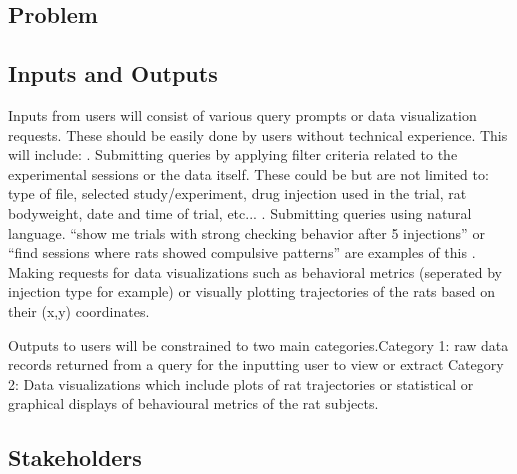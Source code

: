 \documentclass{article}
\begin{document}
\subsection{Problem}

\subsection{Inputs and Outputs}


\par{Inputs from users will consist of various query prompts or data visualization requests. These should be easily done
by users without technical experience. This will include: \newline \newline {}. Submitting queries by applying filter criteria related to the experimental sessions or the data itself.
These could be but are not limited to: type of file, selected study/experiment, drug injection used in the trial,
rat bodyweight, date and time of trial, etc... \newline \newline {}. Submitting queries using natural language. “show me trials with strong checking behavior after 5 injections”
or “find sessions where rats showed compulsive patterns” are examples of this \newline \newline {}. Making requests for data visualizations such as behavioral metrics (seperated by injection type for example) or visually plotting trajectories of the rats
based on their (x,y) coordinates.}
\newline

\par{Outputs to users will be constrained to two main categories.\newline \newline \indent Category 1: raw data records returned from a query for the inputting user to view or extract
\newline \newline \indent Category 2: Data visualizations which include plots of rat trajectories or statistical or graphical displays of behavioural metrics of the rat subjects.}

\subsection{Stakeholders}
\end{document}
